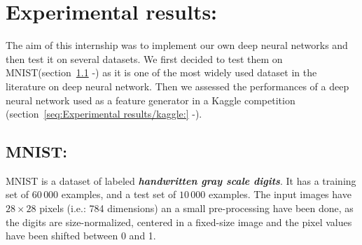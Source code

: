 \documentclass[a4paper,11pt]{report}
\newcommand{\Important}[1]{\textbf{{\em #1}}}
\begin{document}
% 			
% 			
% 			
% 			
% 
% 	


\chapter{Experimental results:}
	\label{chap:Experimental results}
	
	The aim of this internship was to implement our own deep neural networks and then test it on several datasets. We first decided to test them on MNIST(section~\ref{seq:Experimental results/MNIST:} -\cite{LeCun_webPage}) as it is one of the most widely used dataset in the literature on deep neural network. Then we assessed the performances of a deep neural network used as a feature generator in a Kaggle competition (section~\ref{seq:Experimental results/kaggle:} -\cite{Kaggle_higgs}).
	
	
	\section{MNIST:}
		\label{seq:Experimental results/MNIST:}
		MNIST is a dataset of labeled \Important{handwritten gray scale digits}. It has a training set of $60\,000$ examples, and a test set of $10\,000$ examples. The input images have $28 \times 28$ pixels (i.e.: 784 dimensions) an a small pre-processing have been done, as the digits are size-normalized, centered in a fixed-size image and the pixel values have been shifted between 0 and 1.\\\par
\end{document}
